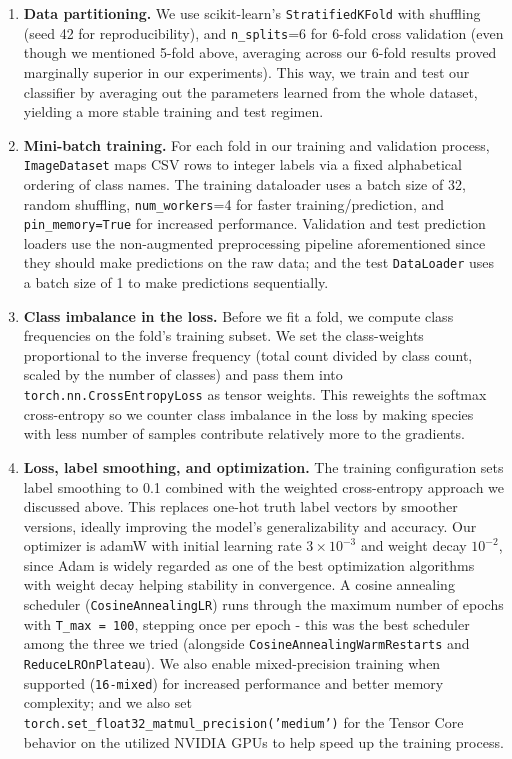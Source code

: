 \documentclass[10pt]{article} %
\begin{document}
\begin{enumerate}
  \item\textbf{Data partitioning.} We use scikit-learn's \texttt{StratifiedKFold} with shuffling (seed 42 for reproducibility), and \texttt{n\_splits}=6 for 6-fold cross validation (even though we mentioned 5-fold above, averaging across our 6-fold results proved marginally superior in our experiments). This way, we train and test our classifier by averaging out the parameters learned from the whole dataset, yielding a more stable training and test regimen.
  \item\textbf{Mini-batch training.} For each fold in our training and validation process, \texttt{ImageDataset} maps CSV rows to integer labels via a fixed alphabetical ordering of class names. The training dataloader uses a batch size of 32, random shuffling, \texttt{num\_workers}=4 for faster training/prediction, and \texttt{pin\_memory=True} for increased performance. Validation and test prediction loaders use the non-augmented preprocessing pipeline aforementioned since they should make predictions on the raw data; and the test \texttt{DataLoader} uses a batch size of 1 to make predictions sequentially.
  \item\textbf{Class imbalance in the loss.} Before we fit a fold, we compute class frequencies on the fold's training subset. We set the class-weights proportional to the inverse frequency (total count divided by class count, scaled by the number of classes) and pass them into \texttt{torch.nn.CrossEntropyLoss} as tensor weights. This reweights the softmax cross-entropy so we counter class imbalance in the loss by making species with less number of samples contribute relatively more to the gradients.
  \item\textbf{Loss, label smoothing, and optimization.} The training configuration sets label smoothing to 0.1 combined with the weighted cross-entropy approach we discussed above. This replaces one-hot truth label vectors by smoother versions, ideally improving the model's generalizability and accuracy. Our optimizer is adamW with initial learning rate $3\times10^{-3}$ and weight decay $10^{-2}$, since Adam is widely regarded as one of the best optimization algorithms with weight decay helping stability in convergence.\cite{loshchilov2019decoupledweightdecayregularization} A cosine annealing scheduler (\texttt{CosineAnnealingLR}) runs through the maximum number of epochs with \texttt{T\_max = 100}, stepping once per epoch - this was the best scheduler among the three we tried (alongside \texttt{CosineAnnealingWarmRestarts} and \texttt{ReduceLROnPlateau}). We also enable mixed-precision training when supported (\texttt{16-mixed}) for increased performance and better memory complexity; and we also set \texttt{torch.set\_float32\_matmul\_precision('medium')} for the Tensor Core behavior on the utilized NVIDIA GPUs to help speed up the training process.

\end{enumerate}
\end{document}

